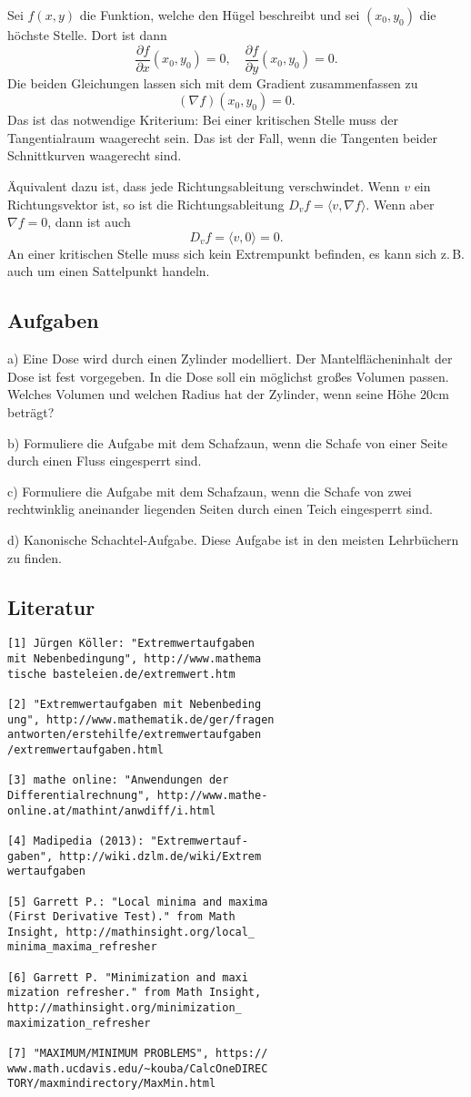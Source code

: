 \documentclass[a4paper,11pt,fleqn,twocolumn]{article}
\begin{document}
Sei \(f(x,y)\) die Funktion, welche den Hügel beschreibt und sei
\((x_0,y_0)\) die höchste Stelle. Dort ist dann
\[\frac{\partial f}{\partial x}(x_0,y_0)=0,\quad
\frac{\partial f}{\partial y}(x_0,y_0)=0.\]
Die beiden Gleichungen lassen sich mit dem Gradient zusammenfassen
zu
\[(\nabla f)(x_0,y_0)=0.\]
Das ist das notwendige Kriterium: Bei einer kritischen Stelle
muss der Tangentialraum waagerecht sein. Das ist der Fall, wenn
die Tangenten beider Schnittkurven waagerecht sind.

Äquivalent dazu ist, dass jede Richtungsableitung verschwindet.
Wenn \(v\) ein Richtungsvektor ist, so ist die Richtungsableitung
\(D_vf = \langle v,\nabla f\rangle\). Wenn aber \(\nabla f=0\),
dann ist auch
\[D_v f = \langle v,0\rangle = 0.\]
An einer kritischen Stelle muss sich kein Extrempunkt befinden,
es kann sich z.\,B. auch um einen Sattelpunkt handeln.

\subsection*{Aufgaben}

a) Eine Dose wird durch einen Zylinder modelliert.
Der Mantelflächeninhalt der Dose ist fest vorgegeben.
In die Dose soll ein möglichst großes Volumen passen.
Welches Volumen und welchen Radius hat der Zylinder, wenn seine
Höhe 20cm beträgt?

b) Formuliere die Aufgabe mit dem Schafzaun, wenn die Schafe von
einer Seite durch einen Fluss eingesperrt sind.

c) Formuliere die Aufgabe mit dem Schafzaun, wenn die Schafe
von zwei rechtwinklig aneinander liegenden Seiten durch einen
Teich eingesperrt sind.

d) Kanonische Schachtel-Aufgabe. Diese Aufgabe ist in den meisten
Lehrbüchern zu finden.

\subsection*{Literatur}

\begin{verbatim}
[1] Jürgen Köller: "Extremwertaufgaben
mit Nebenbedingung", http://www.mathema
tische basteleien.de/extremwert.htm

[2] "Extremwertaufgaben mit Nebenbeding
ung", http://www.mathematik.de/ger/fragen
antworten/erstehilfe/extremwertaufgaben
/extremwertaufgaben.html

[3] mathe online: "Anwendungen der
Differentialrechnung", http://www.mathe-
online.at/mathint/anwdiff/i.html

[4] Madipedia (2013): "Extremwertauf-
gaben", http://wiki.dzlm.de/wiki/Extrem
wertaufgaben

[5] Garrett P.: "Local minima and maxima
(First Derivative Test)." from Math
Insight, http://mathinsight.org/local_
minima_maxima_refresher

[6] Garrett P. "Minimization and maxi
mization refresher." from Math Insight,
http://mathinsight.org/minimization_
maximization_refresher

[7] "MAXIMUM/MINIMUM PROBLEMS", https://
www.math.ucdavis.edu/~kouba/CalcOneDIREC
TORY/maxmindirectory/MaxMin.html
\end{verbatim}
\end{document}
